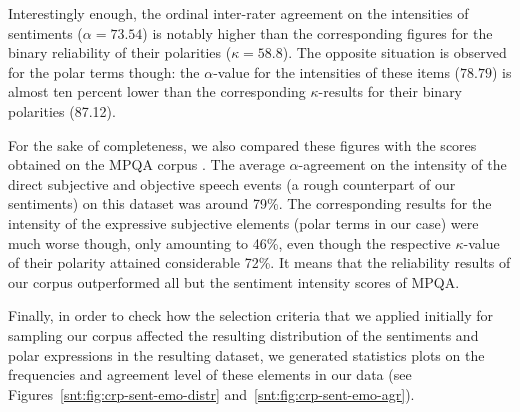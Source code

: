 Interestingly enough, the ordinal inter-rater agreement on the
intensities of sentiments ($\alpha = 73.54$) is notably higher than
the corresponding figures for the binary reliability of their
polarities ($\kappa = 58.8$).  The opposite situation is observed for
the polar terms though: the $\alpha$-value for the
intensities of these items ($78.79$) is almost ten percent lower than
the corresponding $\kappa$-results for their binary polarities
(87.12).

For the sake of completeness, we also compared these figures with the
scores obtained on the MPQA corpus \cite[see][pp. 38, 80]{Wilson:07}.
The average $\alpha$-agreement on the intensity of the direct
subjective and objective speech events (a rough counterpart of our
sentiments) on this dataset was around 79\%.  The corresponding
results for the intensity of the expressive subjective elements
(polar terms in our case) were much worse though, only
amounting to 46\%, even though the respective $\kappa$-value of their
polarity attained considerable 72\%.  It means that the reliability
results of our corpus outperformed all but the sentiment intensity
scores of MPQA.%

Finally, in order to check how the selection criteria that we applied
initially for sampling our corpus affected the resulting distribution
of the sentiments and polar expressions in the resulting dataset, we
generated statistics plots on the frequencies and agreement level of
these elements in our data
(see Figures~\ref{snt:fig:crp-sent-emo-distr}
and~\ref{snt:fig:crp-sent-emo-agr}).


